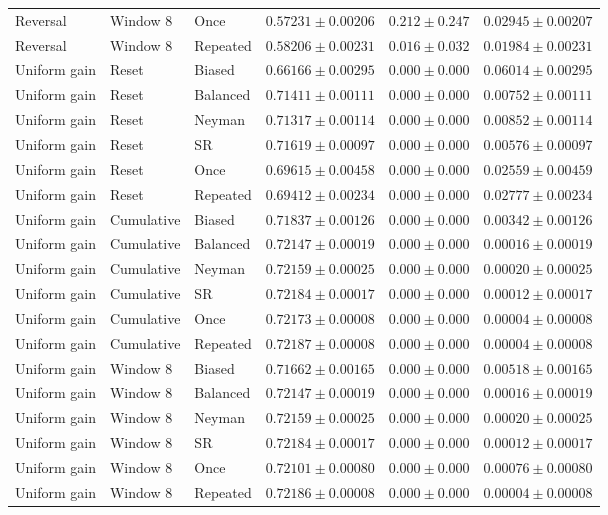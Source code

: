 \begin{longtable}{@{}llllll@{}}
Reversal & Window 8 & Once & $0.57231 \pm 0.00206$ & $0.212 \pm 0.247$ & $0.02945 \pm 0.00207$ \\
Reversal & Window 8 & Repeated & $0.58206 \pm 0.00231$ & $0.016 \pm 0.032$ & $0.01984 \pm 0.00231$ \\
Uniform gain & Reset & Biased & $0.66166 \pm 0.00295$ & $0.000 \pm 0.000$ & $0.06014 \pm 0.00295$ \\
Uniform gain & Reset & Balanced & $0.71411 \pm 0.00111$ & $0.000 \pm 0.000$ & $0.00752 \pm 0.00111$ \\
Uniform gain & Reset & Neyman & $0.71317 \pm 0.00114$ & $0.000 \pm 0.000$ & $0.00852 \pm 0.00114$ \\
Uniform gain & Reset & SR & $0.71619 \pm 0.00097$ & $0.000 \pm 0.000$ & $0.00576 \pm 0.00097$ \\
Uniform gain & Reset & Once & $0.69615 \pm 0.00458$ & $0.000 \pm 0.000$ & $0.02559 \pm 0.00459$ \\
Uniform gain & Reset & Repeated & $0.69412 \pm 0.00234$ & $0.000 \pm 0.000$ & $0.02777 \pm 0.00234$ \\
Uniform gain & Cumulative & Biased & $0.71837 \pm 0.00126$ & $0.000 \pm 0.000$ & $0.00342 \pm 0.00126$ \\
Uniform gain & Cumulative & Balanced & $0.72147 \pm 0.00019$ & $0.000 \pm 0.000$ & $0.00016 \pm 0.00019$ \\
Uniform gain & Cumulative & Neyman & $0.72159 \pm 0.00025$ & $0.000 \pm 0.000$ & $0.00020 \pm 0.00025$ \\
Uniform gain & Cumulative & SR & $0.72184 \pm 0.00017$ & $0.000 \pm 0.000$ & $0.00012 \pm 0.00017$ \\
Uniform gain & Cumulative & Once & $0.72173 \pm 0.00008$ & $0.000 \pm 0.000$ & $0.00004 \pm 0.00008$ \\
Uniform gain & Cumulative & Repeated & $0.72187 \pm 0.00008$ & $0.000 \pm 0.000$ & $0.00004 \pm 0.00008$ \\
Uniform gain & Window 8 & Biased & $0.71662 \pm 0.00165$ & $0.000 \pm 0.000$ & $0.00518 \pm 0.00165$ \\
Uniform gain & Window 8 & Balanced & $0.72147 \pm 0.00019$ & $0.000 \pm 0.000$ & $0.00016 \pm 0.00019$ \\
Uniform gain & Window 8 & Neyman & $0.72159 \pm 0.00025$ & $0.000 \pm 0.000$ & $0.00020 \pm 0.00025$ \\
Uniform gain & Window 8 & SR & $0.72184 \pm 0.00017$ & $0.000 \pm 0.000$ & $0.00012 \pm 0.00017$ \\
Uniform gain & Window 8 & Once & $0.72101 \pm 0.00080$ & $0.000 \pm 0.000$ & $0.00076 \pm 0.00080$ \\
Uniform gain & Window 8 & Repeated & $0.72186 \pm 0.00008$ & $0.000 \pm 0.000$ & $0.00004 \pm 0.00008$ \\
\end{longtable}\endgroup
